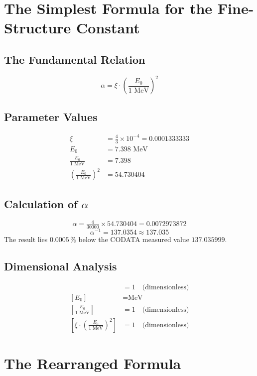 	\section*{The Simplest Formula for the Fine-Structure Constant}
	
	\subsection*{The Fundamental Relation}
	
	\[
	\boxed{\alpha = \xi \cdot \left(\frac{E_0}{1 \text{ MeV}}\right)^2}
	\]
	
	\subsection*{Parameter Values}
	
	\begin{align*}
		\xi &= \frac{4}{3} \times 10^{-4} = 0.0001333333 \\
		E_0 &= 7.398 \text{ MeV} \\
		\frac{E_0}{1 \text{ MeV}} &= 7.398 \\
		\left(\frac{E_0}{1 \text{ MeV}}\right)^2 &= 54.730404
	\end{align*}
	
	\subsection*{Calculation of $\alpha$}
	
	\[
	\alpha = \tfrac{4}{30000} \times 54.730404 = 0.0072973872
	\]
	\[
	\alpha^{-1} = 137.0354 \approx 137.035
	\]
	The result lies $0.0005\,\%$ below the CODATA measured value $137.035999$.

	
	\subsection*{Dimensional Analysis}
	
	\begin{align*}
		[\xi] &= 1 \quad \text{(dimensionless)} \\
		[E_0] &= \text{MeV} \\
		\left[\frac{E_0}{1 \text{ MeV}}\right] &= 1 \quad \text{(dimensionless)} \\
		\left[\xi \cdot \left(\frac{E_0}{1 \text{ MeV}}\right)^2\right] &= 1 \quad \text{(dimensionless)}
	\end{align*}
	
	\section*{The Rearranged Formula}
	
